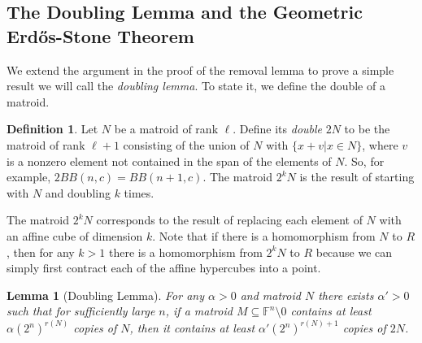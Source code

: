 \documentclass{article}
\theoremstyle{plain}
\newtheorem{lem}[theorem]{Lemma}
\theoremstyle{definition}
\theoremstyle{definition}
\newtheorem{defn}[theorem]{Definition}
\theoremstyle{remark}
\numberwithin{equation}{section}
\newcommand{\FF}{\mathbb{F}}
\begin{document}
\subsection{The Doubling Lemma and the Geometric Erd\texorpdfstring{\H{o}}{o}s-Stone Theorem}

We extend the argument in the proof of the removal lemma to prove a simple result we will call the \emph{doubling lemma}. To state it, we define the double of a matroid.

\begin{defn}
Let $N$ be a matroid of rank $\ell$. Define its \emph{double} $2N$ to be the matroid of rank $\ell+1$ consisting of the union of $N$ with $\{x+v|x\in N\}$, where $v$ is a nonzero element not contained in the span of the elements of $N$. So, for example, $2BB(n,c)=BB(n+1,c)$. The matroid $2^k N$ is the result of starting with $N$ and doubling $k$ times.
\end{defn}

The matroid $2^k N$ corresponds to the result of replacing each element of $N$ with an affine cube of dimension $k$. Note that if there is a homomorphism from $N$ to $R$, then for any $k>1$ there is a homomorphism from $2^k N$ to $R$ because we can simply first contract each of the affine hypercubes into a point.

\begin{lem}[Doubling Lemma]
For any $\alpha>0$ and matroid $N$ there exists $\alpha'>0$ such that for sufficiently large $n$, if a matroid $M\subseteq \FF^n\setminus 0$ contains at least $\alpha (2^n)^{r(N)}$ copies of $N$, then it contains at least $\alpha'(2^n)^{r(N)+1}$ copies of $2N$.
\end{lem}
\end{document}
